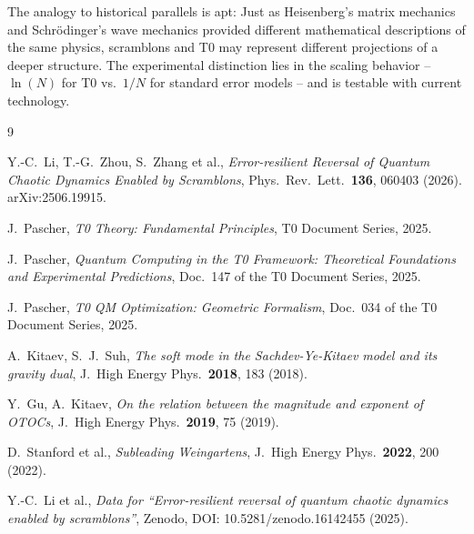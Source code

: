 The analogy to historical parallels is apt: Just as Heisenberg's matrix mechanics and Schrödinger's wave mechanics provided different mathematical descriptions of the same physics, scramblons and T0 may represent different projections of a deeper structure. The experimental distinction lies in the scaling behavior -- $\ln(N)$ for T0 vs.\ $1/N$ for standard error models -- and is testable with current technology.


\begin{thebibliography}{9}

Y.-C.~Li, T.-G.~Zhou, S.~Zhang et al.,
\textit{Error-resilient Reversal of Quantum Chaotic Dynamics Enabled by Scramblons},
Phys.\ Rev.\ Lett.\ \textbf{136}, 060403 (2026).
arXiv:2506.19915.

J.~Pascher,
\textit{T0 Theory: Fundamental Principles},
T0 Document Series, 2025.

J.~Pascher,
\textit{Quantum Computing in the T0 Framework: Theoretical Foundations and Experimental Predictions},
Doc.~147 of the T0 Document Series, 2025.

J.~Pascher,
\textit{T0 QM Optimization: Geometric Formalism},
Doc.~034 of the T0 Document Series, 2025.

A.~Kitaev, S.~J.~Suh,
\textit{The soft mode in the Sachdev-Ye-Kitaev model and its gravity dual},
J.\ High Energy Phys.\ \textbf{2018}, 183 (2018).

Y.~Gu, A.~Kitaev,
\textit{On the relation between the magnitude and exponent of OTOCs},
J.\ High Energy Phys.\ \textbf{2019}, 75 (2019).

D.~Stanford et al.,
\textit{Subleading Weingartens},
J.\ High Energy Phys.\ \textbf{2022}, 200 (2022).

Y.-C.~Li et al.,
\textit{Data for ``Error-resilient reversal of quantum chaotic dynamics enabled by scramblons''},
Zenodo, DOI: 10.5281/zenodo.16142455 (2025).

\end{thebibliography}
